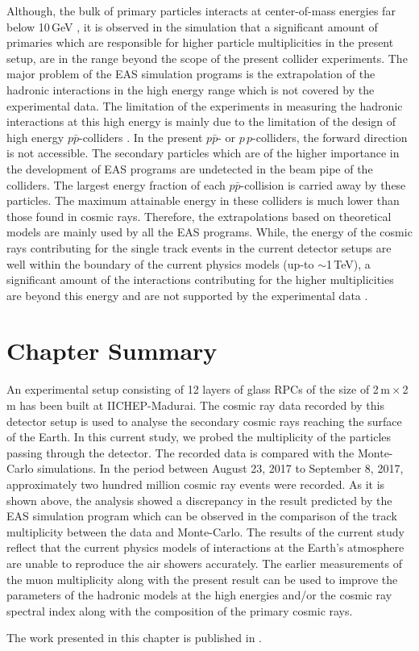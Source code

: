 Although, the bulk of primary particles interacts at center-of-mass
energies far below 10\,GeV \cite{corsika763}, it is observed in the
simulation that a significant amount of primaries which are
responsible for higher particle multiplicities in the present setup,
are in the range beyond the scope of the present collider experiments.
The major problem of the EAS simulation programs is the extrapolation
of the hadronic interactions in the high energy range which is not
covered by the experimental data. The limitation of the experiments
in measuring the hadronic interactions at this high energy is mainly
due to the limitation of the design of high energy $p\bar{p}$-colliders
\cite{corsika763}. In the present $p\bar{p}$- or $p\,p$-colliders, the
forward direction is not accessible. The secondary particles which are
of the higher importance in the development of EAS programs are
undetected in the beam pipe of the colliders. The largest energy
fraction of each $p\bar{p}$-collision is carried away by these
particles.
The maximum attainable energy in these colliders is much lower than
those found in cosmic rays. Therefore, the extrapolations based on
theoretical models are mainly used by all the EAS programs.
While, the energy of the cosmic rays contributing for the single track
events in the current detector setups are well within the boundary of
the current physics models (up-to $\sim$1\,TeV), a significant amount
of the interactions contributing for the higher multiplicities are
beyond this energy and are not supported by the experimental
data \cite{corsika763}.

\section{Chapter Summary}
An experimental setup consisting of 12 layers of glass RPCs of the size
of 2\,m\,$\times$\,2\,m has been built at IICHEP-Madurai. The cosmic
ray data recorded by this detector setup is used to analyse the
secondary cosmic rays reaching the surface of the Earth. In this
current study, we probed the multiplicity of the particles passing
through the detector. The recorded data is compared with the
Monte-Carlo simulations.
In the period between August 23, 2017 to September 8, 2017,
approximately two hundred million cosmic ray events were recorded.
As it is shown above, the analysis showed a discrepancy in the
result predicted by the EAS simulation program which can be observed
in the comparison of the track multiplicity between the data and
Monte-Carlo. The results of the current study reflect that the current
physics models of interactions at the Earth's atmosphere are unable to
reproduce the air showers accurately. The earlier measurements of the
muon multiplicity along with the present result can be used to
improve the parameters of the hadronic models at the high energies
and/or the cosmic ray spectral index along with the composition of the
primary cosmic rays.

The work presented in this chapter is published in \cite{multiparticle}.
